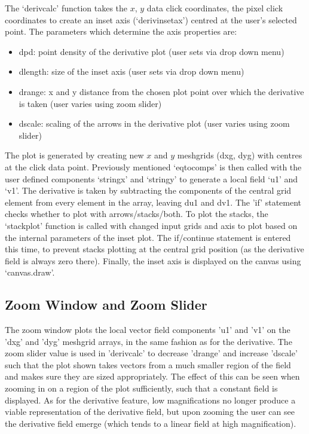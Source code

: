 \documentclass[12pt]{report}
\begin{document}
The `deriv\textunderscore calc' function takes the $x$, $y$ data click coordinates, the pixel click coordinates to create an inset axis (`deriv\textunderscore inset\textunderscore ax') centred at the user's selected point. The parameters which determine the axis properties are:
\begin{itemize}
	\item dpd: point density of the derivative plot (user sets via drop down menu)
	\item d\textunderscore length: size of the inset axis (user sets via drop down menu)
	\item d\textunderscore range: x and y distance from the chosen plot point over which the derivative is taken (user varies using zoom slider)
	\item d\textunderscore scale: scaling of the arrows in the derivative plot (user varies using zoom slider)
\end{itemize}

The plot is generated by creating new $x$ and $y$ meshgrids (dxg, dyg) with centres at the click data point. Previously mentioned `eq\textunderscore to\textunderscore comps' is then called with the user defined components `string\textunderscore x' and `string\textunderscore y' to generate a local field `u1' and `v1'. The derivative is taken by subtracting the components of the central grid element from every element in the array, leaving du1 and dv1. The 'if' statement checks whether to plot with arrows/stacks/both. To plot the stacks, the `stack\textunderscore plot' function is called with changed input grids and axis to plot based on the internal parameters of the inset plot. The if/continue statement is entered this time, to prevent stacks plotting at the central grid position (as the derivative field is always zero there). Finally, the inset axis is displayed on the canvas using `canvas.draw'. 

\subsection{Zoom Window and Zoom Slider}
The zoom window plots the local vector field components 'u1' and 'v1' on the 'dxg' and 'dyg' meshgrid arrays, in the same fashion as for the derivative. The zoom slider value is used in 'deriv\textunderscore calc' to decrease 'd\textunderscore range' and increase 'd\textunderscore scale' such that the plot shown takes vectors from a much smaller region of the field and makes sure they are sized appropriately. The effect of this can be seen when zooming in on a region of the plot sufficiently, such that a constant field is displayed. As for the derivative feature, low magnifications no longer produce a viable representation of the derivative field, but upon zooming the user can see the derivative field emerge (which tends to a linear field at high magnification). 
\end{document}
